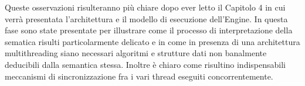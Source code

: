 Queste osservazioni risulteranno più chiare dopo ever letto il Capitolo 4 in cui
verrà presentata l'architettura e il modello di esecuzione dell'Engine. In questa
fase sono state presentate per illustrare come il processo di interpretazione
della sematica risulti particolarmente delicato e in come in presenza di una
architettura multithreading siano necessari algoritmi e strutture dati non
banalmente deducibili dalla semantica stessa. Inoltre è chiaro come risultino
indispensabili meccanismi di sincronizzazione fra i vari thread
eseguiti concorrentemente.


 


